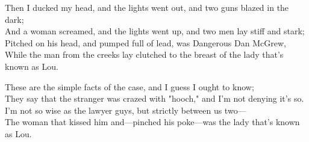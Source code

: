 \begin{poemblock}
Then I ducked my head, and the lights went out, and two guns blazed in the dark;\\
And a woman screamed, and the lights went up, and two men lay stiff and stark;\\
Pitched on his head, and pumped full of lead, was Dangerous Dan McGrew,\\
While the man from the creeks lay clutched to the breast of the lady that's known as Lou.

These are the simple facts of the case, and I guess I ought to know;\\
They say that the stranger was crazed with "hooch," and I'm not denying it's so.\\
I'm not so wise as the lawyer guys, but strictly between us two—\\
The woman that kissed him and—pinched his poke—was the lady that's known as Lou.
\end{poemblock}
